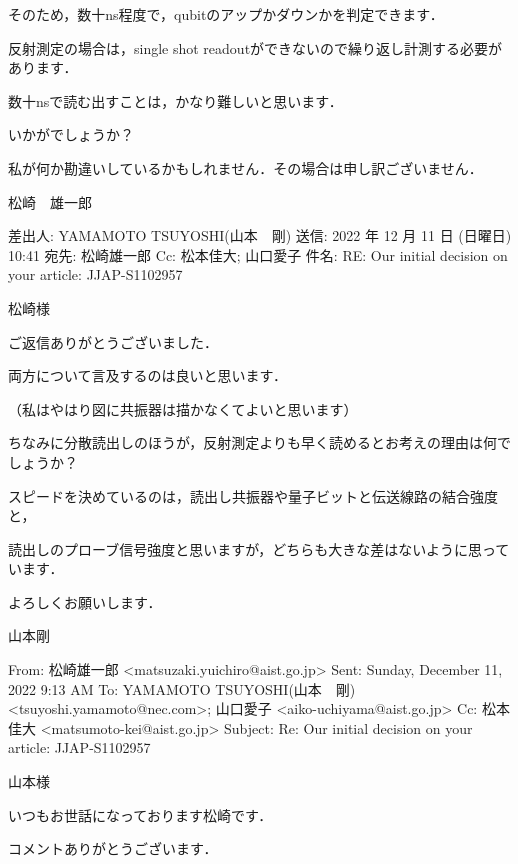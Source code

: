 そのため，数十ns程度で，qubitのアップかダウンかを判定できます．

 

反射測定の場合は，single shot readoutができないので繰り返し計測する必要があります．

数十nsで読む出すことは，かなり難しいと思います．

 

いかがでしょうか？

私が何か勘違いしているかもしれません．その場合は申し訳ございません．

 

松崎　雄一郎

 

 

差出人: YAMAMOTO TSUYOSHI(山本　剛)
送信: 2022 年 12 月 11 日 (日曜日) 10:41
宛先: 松崎雄一郎
Cc: 松本佳大; 山口愛子
件名: RE: Our initial decision on your article: JJAP-S1102957

 

松崎様

 

ご返信ありがとうございました．

 

両方について言及するのは良いと思います．

（私はやはり図に共振器は描かなくてよいと思います）

 

ちなみに分散読出しのほうが，反射測定よりも早く読めるとお考えの理由は何でしょうか？

スピードを決めているのは，読出し共振器や量子ビットと伝送線路の結合強度と，

読出しのプローブ信号強度と思いますが，どちらも大きな差はないように思っています．

 

よろしくお願いします．

山本剛

From: 松崎雄一郎 <matsuzaki.yuichiro@aist.go.jp>
Sent: Sunday, December 11, 2022 9:13 AM
To: YAMAMOTO TSUYOSHI(山本　剛) <tsuyoshi.yamamoto@nec.com>; 山口愛子 <aiko-uchiyama@aist.go.jp>
Cc: 松本佳大 <matsumoto-kei@aist.go.jp>
Subject: Re: Our initial decision on your article: JJAP-S1102957

 

山本様

 

いつもお世話になっております松崎です．

コメントありがとうございます．

 

